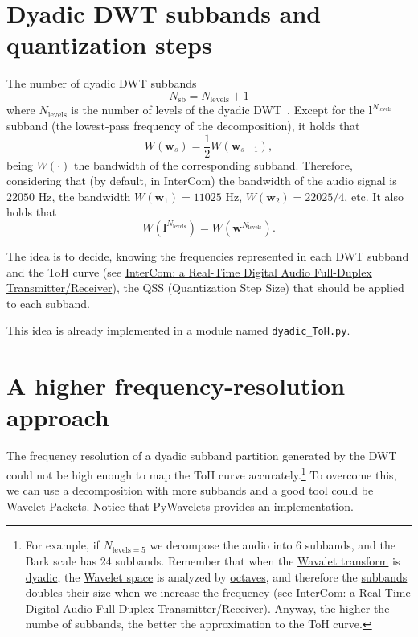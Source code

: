 \section{Dyadic DWT subbands and quantization steps}
The number of dyadic DWT subbands
\begin{equation}
  N_{\text{sb}} = N_{\text{levels}} + 1
\end{equation}
where $N_{\text{levels}}$ is the number of levels of the
dyadic DWT~\cite{vetterli1995wavelets}. Except for the
${\mathbf l}^{N_{\text{levels}}}$ subband (the lowest-pass frequency
of the decomposition), it holds that
\begin{equation}
  W({\mathbf w}_s) = \frac{1}{2}W({\mathbf w}_{s-1}),
\end{equation}
being $W(\cdot)$ the bandwidth of the corresponding
subband. Therefore, considering that (by default, in InterCom) the
bandwidth of the audio signal is $22050$ Hz, the bandwidth
$W({\mathbf w}_1)=11025$ Hz, $W({\mathbf w}_2)=22025/4$, etc. It also
holds that
\begin{equation}
  W({\mathbf l}^{N_{\text{levels}}}) = W({\mathbf w}^{N_{\text{levels}}}).
\end{equation}

The idea is to decide, knowing the frequencies represented in each DWT
subband and the ToH curve (see
\href{https://github.com/Tecnologias-multimedia/InterCom/blob/master/docs/2-hours_seminar.ipynb}{
  InterCom: a Real-Time Digital Audio Full-Duplex
  Transmitter/Receiver}), the QSS (Quantization Step Size) that should
be applied to each subband.

This idea is already implemented in a module named \verb|dyadic_ToH.py|.

\section{A higher frequency-resolution approach}
\label{sec:more_subbands}

The frequency resolution of a dyadic subband partition generated by
the DWT could not be high enough to map the ToH curve
accurately.\footnote{For example, if $N_{\text{levels}=5}$ we
  decompose the audio into 6 subbands, and the Bark scale has 24
  subbands. Remember that when the
  \href{https://en.wikipedia.org/wiki/Wavelet_transform}{Wavalet
    transform} is
  \href{https://en.wikipedia.org/wiki/Dyadic_rational}{dyadic}, the
  \href{https://en.wikipedia.org/wiki/Discrete_wavelet_transform}{Wavelet
    space} is analyzed by
  \href{https://en.wikipedia.org/wiki/Octave_band}{octaves}, and
  therefore the
  \href{https://en.wikipedia.org/wiki/Filter_bank}{subbands} doubles
  their size when we increase the frequency (see \href{https://github.com/Tecnologias-multimedia/InterCom/blob/master/docs/2-hours_seminar.ipynb}{
  InterCom: a Real-Time Digital Audio Full-Duplex
  Transmitter/Receiver}). Anyway, the higher the numbe of subbands, the better the
  approximation to the ToH curve.} To overcome this, we can use a
decomposition with more subbands and a good tool could be
\href{https://en.wikipedia.org/wiki/Wavelet_packet_decomposition}{Wavelet
  Packets}. Notice that PyWavelets provides an
\href{https://pywavelets.readthedocs.io/en/latest/ref/wavelet-packets.html}{implementation}.

